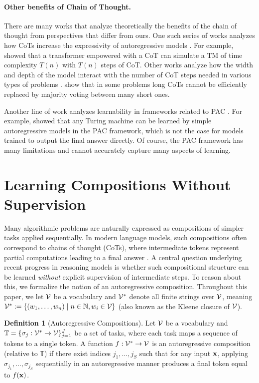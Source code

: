 \documentclass{article}
\theoremstyle{plain}
\theoremstyle{definition}
\newtheorem{definition}[theorem]{Definition}
\theoremstyle{remark}
\begin{document}
\paragraph{Other benefits of Chain of Thought.}
There are many works that analyze theoretically the benefits of the chain of thought from perspectives that differ from ours. One such series of works analyzes how CoTs increase the expressivity of autoregressive models \citep{strobl2024formal}. For example, \citet{merrillexpressive} showed that a transformer empowered with a CoT can simulate a TM of time complexity $T(n)$ with $T(n)$ steps of CoT. Other works analyze how the width and depth of the model interact with the number of CoT steps needed in various types of problems \citep{sanford2024understanding, yehudai2025compositional}. \citet{mirtaheri2025let} show that in some problems long CoTs cannot be efficiently replaced by majority voting between many short ones.

Another line of work analyzes learnability in frameworks related to PAC \citep{malach2023auto, joshi2025theory, shalev2025reasoning, yang2025chain}. For example, \citet{malach2023auto} showed that any Turing machine can be learned by simple autoregressive models in the PAC framework, which is not the case for models trained to output the final answer directly. Of course, the PAC framework has many limitations and cannot accurately capture many aspects of learning.

\section{Learning Compositions Without Supervision}
Many algorithmic problems are naturally expressed as compositions of simpler tasks applied sequentially. In modern language models, such compositions often correspond to chains of thought (CoTs), where intermediate tokens represent partial computations leading to a final answer \citep{wei2022chain, guo2025deepseek}. A central question underlying recent progress in reasoning models is whether such compositional structure can be learned \emph{without} explicit supervision of intermediate steps. To reason about this, we formalize the notion of an autoregressive composition. Throughout this paper, we let $\mathcal{V}$ be a vocabulary and $\mathcal{V}^*$ denote all finite strings over $\mathcal{V}$, meaning $\mathcal{V}^*:=\{(w_1,\ldots, w_n) \mid n\in\mathbb{N}, w_i \in \mathcal{V}\}$ (also known as the Kleene closure of $\mathcal{V}$).

\begin{definition}[Autoregressive Compositions]
    Let $\mathcal{V}$ be a vocabulary and $\mathbb{T}=\{\sigma_j : \mathcal{V}^*\to \mathcal{V}\}_{j=1}^J$ be a set of tasks, where each task maps a sequence of tokens to a single token. A function $f : \mathcal{V}^* \to \mathcal{V}$ is an autoregressive composition (relative to $\mathbb{T}$) if there exist indices $j_1,\ldots,j_S$ such that for any input $\mathbf{x}$, applying $\sigma_{j_1},\ldots,\sigma_{j_S}$ sequentially in an autoregressive manner produces a final token equal to $f(\mathbf{x})$.
\end{definition}
\end{document}
